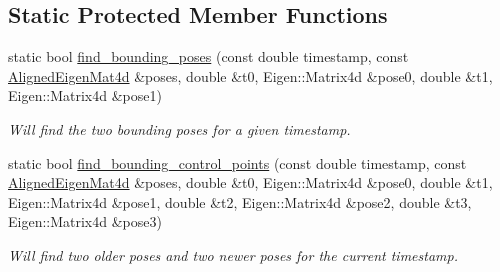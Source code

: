 \subsection*{Static Protected Member Functions}
\begin{DoxyCompactItemize}
\item 
static bool \hyperlink{classov__core_1_1BsplineSE3_a321442ce3c2aee341c64403e047f3f36}{find\+\_\+bounding\+\_\+poses} (const double timestamp, const \hyperlink{classov__core_1_1BsplineSE3_a2e0b3cb7cef84db7b84598f2ea01e00d}{Aligned\+Eigen\+Mat4d} \&poses, double \&t0, Eigen\+::\+Matrix4d \&pose0, double \&t1, Eigen\+::\+Matrix4d \&pose1)
\begin{DoxyCompactList}\small\item\em Will find the two bounding poses for a given timestamp. \end{DoxyCompactList}\item 
static bool \hyperlink{classov__core_1_1BsplineSE3_af03bc0e8df3f77134afa0a24a425be80}{find\+\_\+bounding\+\_\+control\+\_\+points} (const double timestamp, const \hyperlink{classov__core_1_1BsplineSE3_a2e0b3cb7cef84db7b84598f2ea01e00d}{Aligned\+Eigen\+Mat4d} \&poses, double \&t0, Eigen\+::\+Matrix4d \&pose0, double \&t1, Eigen\+::\+Matrix4d \&pose1, double \&t2, Eigen\+::\+Matrix4d \&pose2, double \&t3, Eigen\+::\+Matrix4d \&pose3)
\begin{DoxyCompactList}\small\item\em Will find two older poses and two newer poses for the current timestamp. \end{DoxyCompactList}\end{DoxyCompactItemize}
